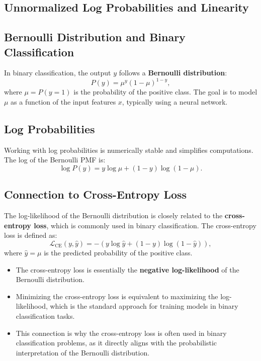 \begin{notechapter}
\section{Unnormalized Log Probabilities and Linearity}

\subsection{Bernoulli Distribution and Binary Classification}
In binary classification, the output \( y \) follows a \textbf{Bernoulli
distribution}:
\[
P(y) = \mu^y (1 - \mu)^{1 - y},
\]
where \( \mu = P(y = 1) \) is the probability of the positive class. The
goal is to model \( \mu \) as a function of the input features \( x \),
typically using a neural network.

\subsection{Log Probabilities}
Working with log probabilities is numerically stable and simplifies
computations. The log of the Bernoulli PMF is:
\[
\log P(y) = y \log \mu + (1 - y) \log (1 - \mu).
\]

\subsection{Connection to Cross-Entropy Loss}
The log-likelihood of the Bernoulli distribution is closely related to
the \textbf{cross-entropy loss}, which is commonly used in binary
classification. The cross-entropy loss is defined as:
\[
\mathcal{L}_{\text{CE}}(y, \hat{y}) = - \left( y \log \hat{y} + (1 - y) 
\log (1 - \hat{y}) \right),
\]
where \( \hat{y} = \mu \) is the predicted probability of the positive
class.

\begin{itemize}
    \item The cross-entropy loss is essentially the \textbf{negative
          log-likelihood} of the Bernoulli distribution.
    \item Minimizing the cross-entropy loss is equivalent to maximizing
          the log-likelihood, which is the standard approach for training
          models in binary classification tasks.
    \item This connection is why the cross-entropy loss is often used in
          binary classification problems, as it directly aligns with the
          probabilistic interpretation of the Bernoulli distribution.
\end{itemize}


\end{notechapter}
